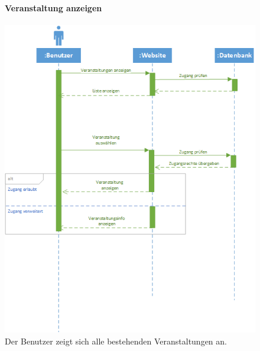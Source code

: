 \documentclass[12pt,a4paper]{article}
\begin{document}
\begin{figure}[H]
	\centering
	\paragraph{Veranstaltung anzeigen}
	\includegraphics[width=\textwidth]{Bilder/Sequenzdiagramme/VeranstaltungAnzeigen.png}
	\caption{Der Benutzer zeigt sich alle bestehenden Veranstaltungen an.}
	\label{SzVeranstaltungenAnzeigen}
\end{figure}
\end{document}
